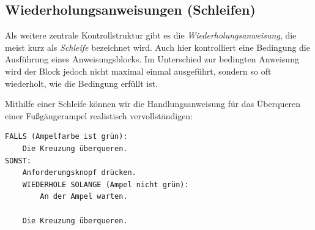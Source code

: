 \subsection{Wiederholungsanweisungen (Schleifen)}

Als weitere zentrale Kontrollstruktur gibt es die \emph{Wiederholungsanweisung},
die meist kurz als \emph{Schleife} bezeichnet wird. Auch hier kontrolliert eine
Bedingung die Ausführung eines Anweisungsblocks. Im Unterschied zur bedingten
Anweisung wird der Block jedoch nicht maximal einmal ausgeführt, sondern so oft
wiederholt, wie die Bedingung erfüllt ist.

Mithilfe einer Schleife können wir die Handlungsanweisung für das Überqueren
einer Fußgängerampel realistisch vervollständigen:

\begin{lstlisting}
FALLS (Ampelfarbe ist grün):
    Die Kreuzung überqueren.
SONST:
    Anforderungsknopf drücken.
    WIEDERHOLE SOLANGE (Ampel nicht grün):
        An der Ampel warten.

    Die Kreuzung überqueren.
\end{lstlisting}
